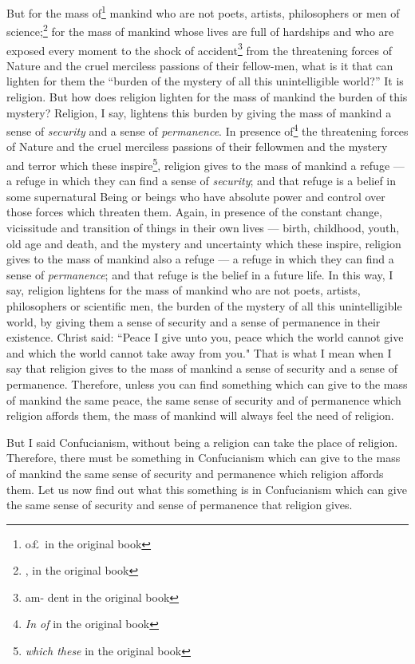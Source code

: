 But for the mass of\footnote{o\pounds\, in the original book} mankind who are not poets, artists, philosophers or men of science;\footnote{, in the original book} for the mass of mankind whose lives are full of hardships and who are exposed every moment to the shock of accident\footnote{am- dent in the original book} from the threatening forces of Nature and the cruel merciless passions of their fellow-men, what is it that can lighten for them the ``burden of the mystery of all this unintelligible world?''
It is religion.
But how does religion lighten for the mass of mankind the burden of this mystery?
Religion, I say, lightens this burden by giving the mass of mankind a sense of \emph{security} and a sense of \emph{permanence}.
In presence of\footnote{\emph{In of} in the original book} the threatening forces of Nature and the cruel merciless passions of their fellowmen and the mystery and terror which these inspire\footnote{\emph{which these} in the original book}, religion gives to the mass of mankind a refuge --- a refuge in which they can find a sense of \emph{security}; and that refuge is a belief in some supernatural Being or beings who have absolute power and control over those forces which threaten them.
Again, in presence of the constant change, vicissitude and transition of things in their own lives --- birth, childhood, youth, old age and death, and the mystery and uncertainty which these inspire, religion gives to the mass of mankind also a refuge --- a refuge in which they can find a sense of \emph{permanence}; and that refuge is the belief in a future life.
In this way, I say, religion lightens for the mass of mankind who are not poets, artists, philosophers or scientific men, the burden of the mystery of all this unintelligible world, by giving them a sense of security and a sense of permanence in their existence.
Christ said: ``Peace I give unto you, peace which the world cannot give and which the world cannot take away from you."
That is what I mean when I say that religion gives to the mass of mankind a sense of security and a sense of permanence.
Therefore, unless you can find something which can give to the mass of mankind the same peace, the same sense of security and of permanence which religion affords them, the mass of mankind will always feel the need of religion.

But I said Confucianism, without being a religion can take the place of religion.
Therefore, there must be something in Confucianism which can give to the mass of mankind the same sense of security and permanence which religion affords them.
Let us now find out what this something is in Confucianism which can give the same sense of security and sense of permanence that religion gives.

